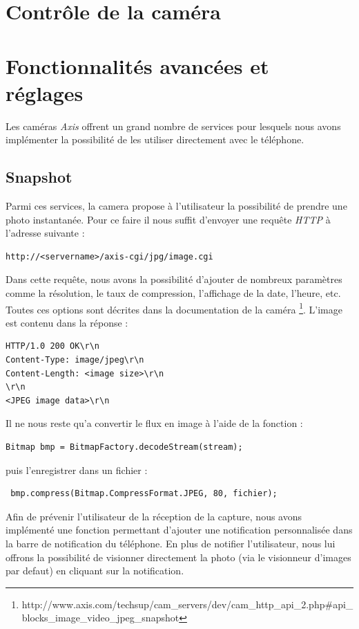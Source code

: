 \section{Contrôle de la caméra}

\section{Fonctionnalités avancées et réglages}
Les caméras \textit{Axis} offrent un grand nombre de services pour lesquels
nous avons implémenter la possibilité de les utiliser directement avec le
téléphone.
\subsection{Snapshot}
Parmi ces services, la camera propose à l'utilisateur la possibilité de
prendre une photo instantanée. \newline
Pour ce faire il nous suffit d'envoyer une requête \textit{HTTP} à l'adresse
suivante : 
\begin{lstlisting}
http://<servername>/axis-cgi/jpg/image.cgi
\end{lstlisting}
Dans cette requête, nous avons la possibilité d'ajouter de nombreux paramètres
comme la résolution, le taux de compression, l'affichage de la date, l'heure,
etc. Toutes ces options sont décrites dans la documentation de la caméra
\footnote{\label{MjpegView}http://www.axis.com/techsup/cam\_servers/dev/cam\_http\_api\_2.php\#api\_blocks\_image\_video\_jpeg\_snapshot}.
L'image est contenu dans la réponse :
\begin{lstlisting}
HTTP/1.0 200 OK\r\n
Content-Type: image/jpeg\r\n
Content-Length: <image size>\r\n
\r\n
<JPEG image data>\r\n
\end{lstlisting}
Il ne nous reste qu'a convertir le flux en image
à l'aide de la fonction :
\begin{lstlisting}
Bitmap bmp = BitmapFactory.decodeStream(stream);
\end{lstlisting}
puis l'enregistrer dans un fichier :
\begin{lstlisting}
 bmp.compress(Bitmap.CompressFormat.JPEG, 80, fichier);
\end{lstlisting}
Afin de prévenir l'utilisateur de la réception de la capture, nous avons
implémenté une fonction permettant d'ajouter une notification personnalisée dans
la barre de notification du téléphone.\newline
En plus de notifier l'utilisateur, nous lui offrons la possibilité de visionner directement la photo (via le visionneur d'images par defaut) en cliquant sur la notification.

